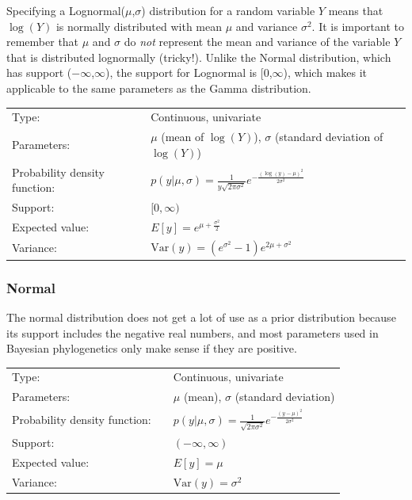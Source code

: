 \documentclass[10pt]{article}
\newcommand{\Var}{\mbox{Var}}
\begin{document}
Specifying a Lognormal($\mu$,$\sigma$) distribution for a random variable $Y$ means that $\log(Y)$ is normally distributed with mean $\mu$ and variance $\sigma^2$. It is important to remember that $\mu$ and $\sigma$ do {\em not} represent the mean and variance of the variable $Y$ that is distributed lognormally (tricky!). Unlike the Normal distribution, which has support ($-\infty$,$\infty$), the support for Lognormal is [0,$\infty$), which makes it applicable to the same parameters as the Gamma distribution.

\begin{tabular}{lcl}
Type:                 & & Continuous, univariate \\
Parameters:           & & $\mu$ (mean of $\log(Y)$), $\sigma$ (standard deviation of $\log(Y)$)    \\
Probability density function: & & $p(y|\mu,\sigma) = \frac{1}{y \sqrt{2 \pi \sigma^2}} e^{-\frac{(\log(y)-\mu)^2}{2 \sigma^2}}$ \\
Support:              & & $[0,\infty)$     \\
Expected value:       & & $E[y] = e^{\mu + \frac{\sigma^2}{2}}$ \\
Variance:             & & $\Var(y) = \left( e^{\sigma^2} - 1 \right) e^{2 \mu + \sigma^2}$ 
\end{tabular}

\subsubsection{Normal}

The normal distribution does not get a lot of use as a prior distribution because its support includes the negative real numbers, and most parameters used in Bayesian phylogenetics only make sense if they are positive.

\begin{tabular}{lcl}
Type:                 & & Continuous, univariate \\
Parameters:           & & $\mu$ (mean), $\sigma$ (standard deviation)    \\
Probability density function: & & $p(y|\mu,\sigma) = \frac{1}{\sqrt{2 \pi \sigma^2}} e^{-\frac{(y-\mu)^2}{2 \sigma^2}}$ \\
Support:              & & $(-\infty,\infty)$     \\
Expected value:       & & $E[y] = \mu$ \\
Variance:             & & $\Var(y) = \sigma^2$ 
\end{tabular}
\end{document}
